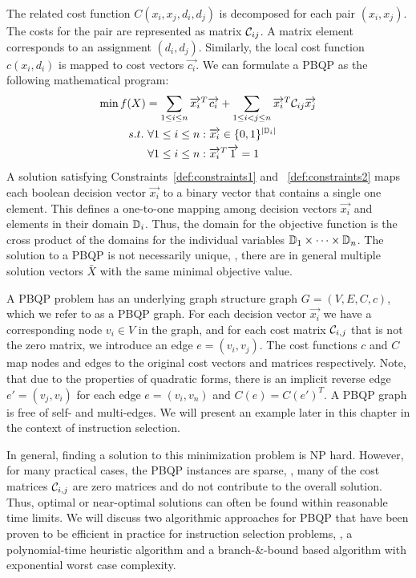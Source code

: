 The related cost function $C(x_i,x_j,d_i,d_j)$ is decomposed for each
pair $(x_i,x_j)$. The costs for the pair are represented as matrix
${\mathcal C}_{ij}$. A matrix element corresponds to an assignment
$(d_i, d_j)$. Similarly, the local cost function $c(x_i,d_i)$ is
mapped to cost vectors $\vec{c_i}$. We can formulate a PBQP as the
following mathematical program:
\begin{align}
  \min f(X) &=
  \sum_{1 \leq i \leq n} \overrightarrow{x_i}^{T} \overrightarrow{c_i}  +
  \sum_{1 \leq i < j \leq n}
  \overrightarrow{x_i}^{T}  {\mathcal C}_{ij} \overrightarrow{x_j} \\
  \ s.t. \,        &\,  \forall 1 \leq i \leq n : \overrightarrow{x_i} \in \{0,1\}^{|\mathbb D_i|}  \label{def:constraints1}\\
  &\,  \forall 1 \leq i \leq n : \overrightarrow{x_i}^T \overrightarrow{1} = 1 \label{def:constraints2}
\end{align}
A solution satisfying Constraints~\ref{def:constraints1} and
~\ref{def:constraints2} maps each boolean decision vector $\vec{x_i}$
to a binary vector that contains a single one element. This defines a
one-to-one mapping among decision vectors $\vec{x_i}$ and elements in
their domain $\mathbb D_i$. Thus, the domain for the objective
function is the cross product of the domains for the individual
variables $\mathbb D_1 \times \dots \times \mathbb D_n$. The
solution to a PBQP is not necessarily unique, \ie, there are in
general multiple solution vectors $\bar{X}$ with the same minimal
objective value.

A PBQP problem has an underlying graph structure graph $G=(V,E,C,c)$,
which we refer to as a PBQP graph. For each decision vector
$\vec{x_i}$ we have a corresponding node $v_i \in V$ in the graph, and
for each cost matrix ${\mathcal C}_{i,j}$ that is not the zero
matrix, we introduce an edge $e=(v_i,v_j)$. The cost functions $c$ and
$C$ map nodes and edges to the original cost vectors and matrices
respectively. Note, that due to the properties of quadratic forms,
there is an implicit reverse edge $e'=(v_j,v_i)$ for each edge
$e=(v_i,v_n)$ and $C(e) = C(e')^T$. A PBQP graph is free of self- and
multi-edges. We will present an example later in this chapter in the
context of instruction selection.

In general, finding a solution to this minimization problem is NP
hard.  However, for many practical cases, the PBQP instances are
sparse, \ie, many of the cost matrices ${\mathcal C}_{i,j}$ are
zero matrices and do not contribute to the overall solution. Thus,
optimal or near-optimal solutions can often be found within reasonable
time limits.
We will discuss two algorithmic approaches for PBQP that have been
proven to be efficient in practice for instruction selection problems,
\ie, a polynomial-time heuristic algorithm and a branch-\&-bound based
algorithm with exponential worst case complexity.

